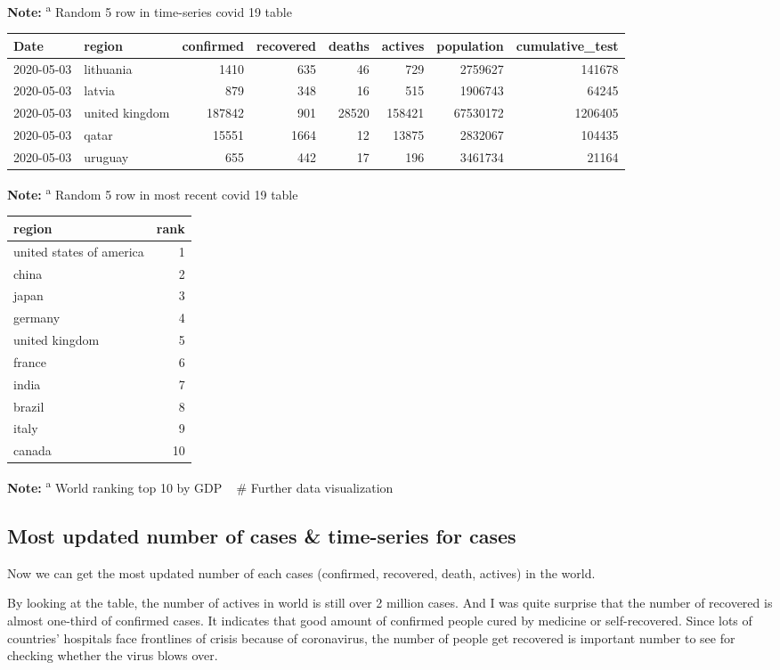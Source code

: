 \documentclass[
  11pt,
]{article}
\begin{document}
\textbf{Note:} \textsuperscript{a} Random 5 row in time-series covid 19
table

\begin{longtable}[]{@{}llrrrrrr@{}}
\toprule
Date & region & confirmed & recovered & deaths & actives & population &
cumulative\_test\tabularnewline
\midrule
\endhead
2020-05-03 & lithuania & 1410 & 635 & 46 & 729 & 2759627 &
141678\tabularnewline
2020-05-03 & latvia & 879 & 348 & 16 & 515 & 1906743 &
64245\tabularnewline
2020-05-03 & united kingdom & 187842 & 901 & 28520 & 158421 & 67530172 &
1206405\tabularnewline
2020-05-03 & qatar & 15551 & 1664 & 12 & 13875 & 2832067 &
104435\tabularnewline
2020-05-03 & uruguay & 655 & 442 & 17 & 196 & 3461734 &
21164\tabularnewline
\bottomrule
\end{longtable}

\textbf{Note:} \textsuperscript{a} Random 5 row in most recent covid 19
table

\begin{longtable}[]{@{}lr@{}}
\toprule
region & rank\tabularnewline
\midrule
\endhead
united states of america & 1\tabularnewline
china & 2\tabularnewline
japan & 3\tabularnewline
germany & 4\tabularnewline
united kingdom & 5\tabularnewline
france & 6\tabularnewline
india & 7\tabularnewline
brazil & 8\tabularnewline
italy & 9\tabularnewline
canada & 10\tabularnewline
\bottomrule
\end{longtable}

\textbf{Note:} \textsuperscript{a} World ranking top 10 by GDP ~ \#
Further data visualization

\hypertarget{most-updated-number-of-cases-time-series-for-cases}{%
\subsection{Most updated number of cases \& time-series for
cases}\label{most-updated-number-of-cases-time-series-for-cases}}

Now we can get the most updated number of each cases (confirmed,
recovered, death, actives) in the world.

By looking at the table, the number of actives in world is still over 2
million cases. And I was quite surprise that the number of recovered is
almost one-third of confirmed cases. It indicates that good amount of
confirmed people cured by medicine or self-recovered. Since lots of
countries' hospitals face frontlines of crisis because of coronavirus,
the number of people get recovered is important number to see for
checking whether the virus blows over.
\end{document}
